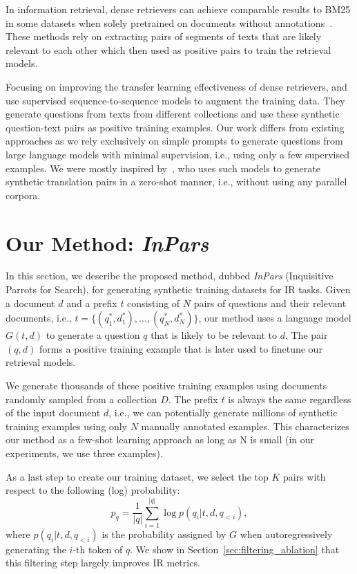\documentclass[11pt]{article}
\begin{document}
In information retrieval, dense retrievers can achieve comparable results to BM25 in some datasets when solely pretrained on documents without annotations~\cite{ram2021learning,izacard2021towards,neelakantan2022text}. These methods rely on extracting pairs of segments of texts that are likely relevant to each other which then used as positive pairs to train the retrieval models.

Focusing on improving the transfer learning effectiveness of dense retrievers, \citet{ma-etal-2021-zero} and \citet{wang2021gpl} use supervised sequence-to-sequence models to augment the training data. They generate questions from texts from different collections and use these synthetic question-text pairs as positive training examples.
Our work differs from existing approaches as we rely exclusively on simple prompts to generate questions from large language models with minimal supervision, i.e., using only a few supervised examples.
We were mostly inspired by~\citet{han2021unsupervised}, who uses such models to generate synthetic translation pairs in a zero-shot manner, i.e., without using any parallel corpora.


\section{Our Method: \textit{InPars}}
\label{sec:method}

In this section, we describe the proposed method, dubbed \textit{InPars} (Inquisitive Parrots for Search), for generating synthetic training datasets for IR tasks.
Given a document $d$ and a prefix $t$ consisting of $N$ pairs of questions and their relevant documents, i.e., $t=\{(q_1^*,d_1^*), ..., (q_N^*,d_N^*)\}$, our method uses a language model $G(t,d)$ to generate a question $q$ that is likely to be relevant to $d$.
The pair $(q, d)$ forms a positive training example that is later used to finetune our retrieval models.

We generate thousands of these positive training examples using documents randomly sampled from a collection $D$. The prefix $t$ is always the same regardless of the input document $d$, i.e., we can potentially generate millions of synthetic training examples using only $N$ manually annotated examples. This characterizes our method as a few-shot learning approach as long as N is small (in our experiments, we use three examples).

As a last step to create our training dataset, we select the top $K$ pairs with respect to the following (log) probability:
\begin{equation}
    p_{q} = \frac{1}{|q|} \sum_{i=1}^{|q|} \log p(q_i|t,d,q_{<i}),
\end{equation}
\noindent where $p(q_i|t,d,q_{<i})$ is the probability assigned by $G$ when autoregressively generating the $i$-th token of $q$.
We show in Section~\ref{sec:filtering_ablation} that this filtering step largely improves IR metrics. 
\end{document}
